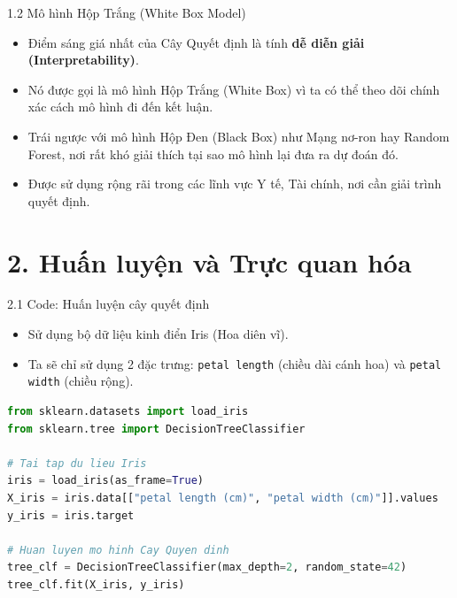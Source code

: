 \documentclass[aspectratio=169, 12pt]{beamer}
\begin{document}
\begin{frame}{1.2 Mô hình Hộp Trắng (White Box Model)}
    \begin{itemize}
        \item Điểm sáng giá nhất của Cây Quyết định là tính \textbf{dễ diễn giải (Interpretability)}.
        \item Nó được gọi là mô hình Hộp Trắng (White Box) vì ta có thể theo dõi chính xác cách mô hình đi đến kết luận.
        \item Trái ngược với mô hình Hộp Đen (Black Box) như Mạng nơ-ron hay Random Forest, nơi rất khó giải thích tại sao mô hình lại đưa ra dự đoán đó.
        \item Được sử dụng rộng rãi trong các lĩnh vực Y tế, Tài chính, nơi cần giải trình quyết định.
    \end{itemize}
\end{frame}

\section{2. Huấn luyện và Trực quan hóa}

\begin{frame}[fragile]{2.1 Code: Huấn luyện cây quyết định}
    \begin{itemize}
        \item Sử dụng bộ dữ liệu kinh điển Iris (Hoa diên vĩ).
        \item Ta sẽ chỉ sử dụng 2 đặc trưng: \texttt{petal length} (chiều dài cánh hoa) và \texttt{petal width} (chiều rộng).
    \end{itemize}
\begin{lstlisting}[language=Python]
from sklearn.datasets import load_iris
from sklearn.tree import DecisionTreeClassifier

# Tai tap du lieu Iris
iris = load_iris(as_frame=True)
X_iris = iris.data[["petal length (cm)", "petal width (cm)"]].values
y_iris = iris.target

# Huan luyen mo hinh Cay Quyen dinh
tree_clf = DecisionTreeClassifier(max_depth=2, random_state=42)
tree_clf.fit(X_iris, y_iris)
\end{lstlisting}
\end{frame}
\end{document}
